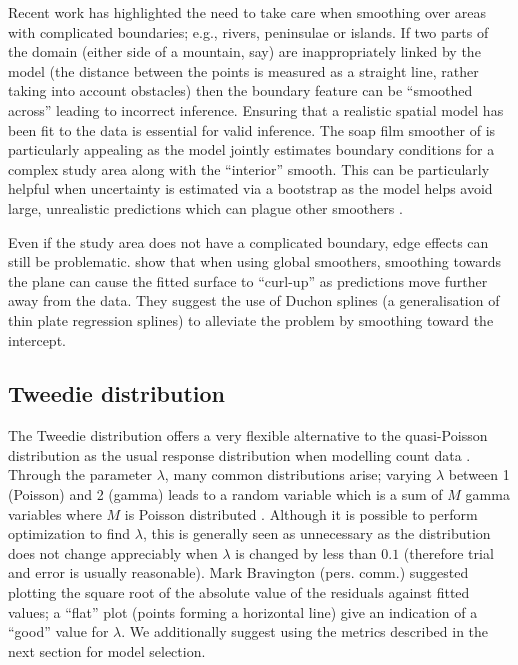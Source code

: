 \documentclass[a4paper,12pt]{article}
\begin{document}
Recent work \citep{Ramsay:2002uo,Wang:2007tf,Wood:2008vo,ScottHayward:2011tc,Miller:2012tm} has highlighted the need to take care when smoothing over areas with complicated boundaries; e.g., rivers, peninsulae or islands. If two parts of the domain (either side of a mountain, say) are inappropriately linked by the model (the distance between the points is measured as a straight line, rather taking into account obstacles) then the boundary feature can be ``smoothed across'' leading to incorrect inference. Ensuring that a realistic spatial model has been fit to the data is essential for valid inference. The soap film smoother of \cite{Wood:2008vo} is particularly appealing as the model jointly estimates boundary conditions for a complex study area along with the ``interior'' smooth. This can be particularly helpful when uncertainty is estimated via a bootstrap as the model helps avoid large, unrealistic predictions which can plague other smoothers \citep{Bravington:2009vo}.

Even if the study area does not have a complicated boundary, edge effects can still be problematic. \cite{Miller:wx} show that when using global smoothers, smoothing towards the plane can cause the fitted surface to ``curl-up'' as predictions move further away from the data. They suggest the use of Duchon splines (a generalisation of thin plate regression splines) to alleviate the problem by smoothing toward the intercept.

\subsection*{Tweedie distribution}
\label{s:Tweedie}

The Tweedie distribution offers a very flexible alternative to the quasi-Poisson distribution as the usual response distribution when modelling count data \citep{Candy:2004tb}. Through the parameter $\lambda$, many common distributions arise; varying $\lambda$ between 1 (Poisson) and 2 (gamma) leads to a random variable which is a sum of $M$ gamma variables where $M$ is Poisson distributed \citep{Jorgensen:1987vg}. Although it is possible to perform optimization to find $\lambda$, this is generally seen as unnecessary as the distribution does not change appreciably when $\lambda$ is changed by less than $0.1$ (therefore trial and error is usually reasonable). Mark Bravington (pers. comm.) suggested plotting the square root of the absolute value of the residuals against fitted values; a ``flat'' plot (points forming a horizontal line) give an indication of a ``good'' value for $\lambda$. We additionally suggest using the metrics described in the next section for model selection.
\end{document}
